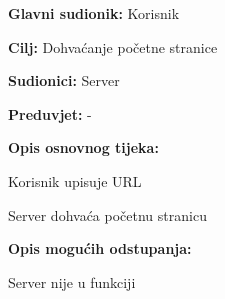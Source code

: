 					\noindent {}
					\begin{packed_item}
						\item \textbf{Glavni sudionik:} Korisnik
						\item \textbf{Cilj:} Dohvaćanje početne stranice
						\item \textbf{Sudionici:} Server
						\item \textbf{Preduvjet:} -
						\item \textbf{Opis osnovnog tijeka:}
						\begin{packed_enum}
							\item Korisnik upisuje URL
							\item Server dohvaća početnu stranicu
						\end{packed_enum}
						\item \textbf{Opis mogućih odstupanja:}
						\begin{packed_item}
							\item[2.a] Server nije u funkciji
						\end{packed_item}
					\end{packed_item}

